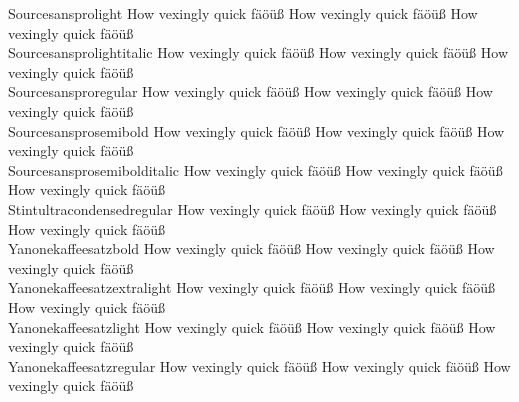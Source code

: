 \begin{tabbing}
Sourcesansprolight \> {\mktsStyleNormal{}How vexingly quick fäöüß} {\Sourcesansprolight{}How vexingly quick fäöüß} {\mktsStyleItalic{}How vexingly quick fäöüß} \\
Sourcesansprolightitalic \> {\mktsStyleNormal{}How vexingly quick fäöüß} {\Sourcesansprolightitalic{}How vexingly quick fäöüß} {\mktsStyleItalic{}How vexingly quick fäöüß} \\
Sourcesansproregular \> {\mktsStyleNormal{}How vexingly quick fäöüß} {\Sourcesansproregular{}How vexingly quick fäöüß} {\mktsStyleItalic{}How vexingly quick fäöüß} \\
Sourcesansprosemibold \> {\mktsStyleNormal{}How vexingly quick fäöüß} {\Sourcesansprosemibold{}How vexingly quick fäöüß} {\mktsStyleItalic{}How vexingly quick fäöüß} \\
Sourcesansprosemibolditalic \> {\mktsStyleNormal{}How vexingly quick fäöüß} {\Sourcesansprosemibolditalic{}How vexingly quick fäöüß} {\mktsStyleItalic{}How vexingly quick fäöüß} \\
Stintultracondensedregular \> {\mktsStyleNormal{}How vexingly quick fäöüß} {\Stintultracondensedregular{}How vexingly quick fäöüß} {\mktsStyleItalic{}How vexingly quick fäöüß} \\
Yanonekaffeesatzbold \> {\mktsStyleNormal{}How vexingly quick fäöüß} {\Yanonekaffeesatzbold{}How vexingly quick fäöüß} {\mktsStyleItalic{}How vexingly quick fäöüß} \\
Yanonekaffeesatzextralight \> {\mktsStyleNormal{}How vexingly quick fäöüß} {\Yanonekaffeesatzextralight{}How vexingly quick fäöüß} {\mktsStyleItalic{}How vexingly quick fäöüß} \\
Yanonekaffeesatzlight \> {\mktsStyleNormal{}How vexingly quick fäöüß} {\Yanonekaffeesatzlight{}How vexingly quick fäöüß} {\mktsStyleItalic{}How vexingly quick fäöüß} \\
Yanonekaffeesatzregular \> {\mktsStyleNormal{}How vexingly quick fäöüß} {\Yanonekaffeesatzregular{}How vexingly quick fäöüß} {\mktsStyleItalic{}How vexingly quick fäöüß} \\
\end{tabbing}



